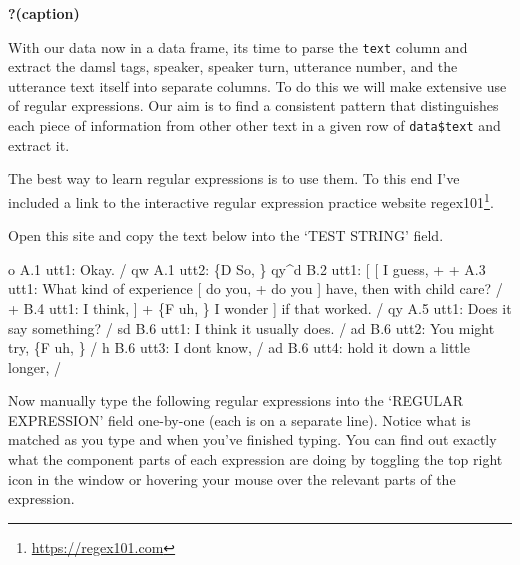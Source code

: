 \documentclass[
  letterpaper,
  DIV=11,
  numbers=noendperiod]{scrreport}
\newenvironment{Shaded}{\begin{snugshade}}{\end{snugshade}}
\newcommand{\NormalTok}[1]{\textcolor[rgb]{0.00,0.00,0.00}{#1}}
\theoremstyle{definition}
\theoremstyle{remark}
\DeclareRobustCommand{\href}[2]{#2\footnote{\url{#1}}}
\begin{document}
\begin{table}

\caption{\textbf{?(caption)}}

\end{table}

With our data now in a data frame, its time to parse the \texttt{text}
column and extract the damsl tags, speaker, speaker turn, utterance
number, and the utterance text itself into separate columns. To do this
we will make extensive use of regular expressions. Our aim is to find a
consistent pattern that distinguishes each piece of information from
other other text in a given row of \texttt{data\$text} and extract it.

The best way to learn regular expressions is to use them. To this end
I've included a link to the interactive regular expression practice
website \href{https://regex101.com}{regex101}.

Open this site and copy the text below into the `TEST STRING' field.

\begin{Shaded}
\begin{Highlighting}[]
\NormalTok{o          A.1 utt1: Okay.  /}
\NormalTok{qw          A.1 utt2: \{D So, \}}
\NormalTok{qy\^{}d          B.2 utt1: [ [ I guess, +}
\NormalTok{+          A.3 utt1: What kind of experience [ do you, + do you ] have, then with child care? /}
\NormalTok{+          B.4 utt1: I think, ] + \{F uh, \} I wonder ] if that worked. /}
\NormalTok{qy          A.5 utt1: Does it say something? /}
\NormalTok{sd          B.6 utt1: I think it usually does.  /}
\NormalTok{ad          B.6 utt2: You might try, \{F uh, \}  /}
\NormalTok{h          B.6 utt3: I don\textquotesingle{}t know,  /}
\NormalTok{ad          B.6 utt4: hold it down a little longer,  /}
\end{Highlighting}
\end{Shaded}

Now manually type the following regular expressions into the `REGULAR
EXPRESSION' field one-by-one (each is on a separate line). Notice what
is matched as you type and when you've finished typing. You can find out
exactly what the component parts of each expression are doing by
toggling the top right icon in the window or hovering your mouse over
the relevant parts of the expression.

\begin{Shaded}
\end{Shaded}
\end{document}
